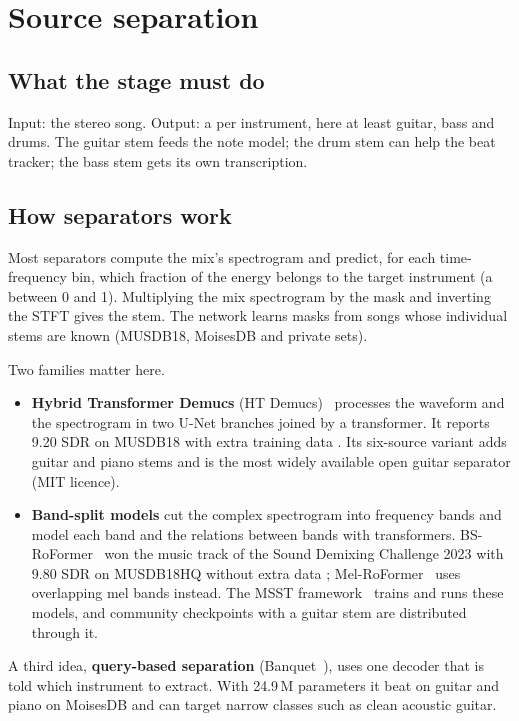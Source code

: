 \section{Source separation}
\label{sec:separation}

\subsection{What the stage must do}

Input: the stereo song. Output: a  per instrument, here at least
guitar, bass and drums. The guitar stem feeds the note model; the drum stem can
help the beat tracker; the bass stem gets its own transcription.

\subsection{How separators work}

\begin{keyidea}[: masking]
Most separators compute the mix's spectrogram and predict, for each
time-frequency bin, which fraction of the energy belongs to the target
instrument (a  between 0 and 1). Multiplying the mix spectrogram by
the mask and inverting the STFT gives the stem. The network learns masks from
songs whose individual stems are known (MUSDB18, MoisesDB and private sets).
\end{keyidea}

Two families matter here.
\begin{itemize}
\item \textbf{Hybrid Transformer Demucs} (HT Demucs)~\cite{rouard2023htdemucs}
  processes the waveform and the spectrogram in two U-Net branches joined by a
  transformer. It reports 9.20\dB{} SDR on MUSDB18 with extra training data
  \reported. Its six-source variant  adds guitar and piano
  stems and is the most widely available open guitar separator (MIT licence).
\item \textbf{Band-split models} cut the complex spectrogram into frequency
  bands and model each band and the relations between bands with transformers.
  BS-RoFormer~\cite{lu2023bsroformer} won the music track of the Sound Demixing
  Challenge 2023 with 9.80\dB{} SDR on MUSDB18HQ without extra data
  \reported; Mel-RoFormer~\cite{wang2023melroformer} uses overlapping mel bands
  instead. The MSST framework~\cite{solovyev2026msst} trains and runs these
  models, and community checkpoints with a guitar stem are distributed through
  it.
\end{itemize}
A third idea, \textbf{query-based separation}
(Banquet~\cite{watcharasupat2024banquet}), uses one decoder that is told which
instrument to extract. With 24.9\,M parameters it beat  on
guitar and piano on MoisesDB \reported{} and can target narrow classes such as
clean acoustic guitar.

